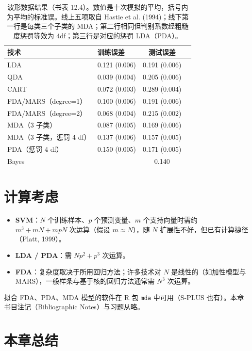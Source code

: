\begin{table}[htbp]
\centering
\caption{波形数据结果（书表 12.4）。数值是十次模拟的平均，括号内为平均的标准误。线上五项取自 Hastie et al. (1994)；线下第一行是每类三个子类的 MDA；第二行相同但判别系数经粗糙度惩罚等效为 4df；第三行是对应的惩罚 LDA（PDA）。}
\label{tab:12_4}
\begin{tabular}{llcc}
\toprule
技术 & 训练误差 & 测试误差 \\
\midrule
LDA & 0.121 (0.006) & 0.191 (0.006) \\
QDA & 0.039 (0.004) & 0.205 (0.006) \\
CART & 0.072 (0.003) & 0.289 (0.004) \\
FDA/MARS（degree=1） & 0.100 (0.006) & 0.191 (0.006) \\
FDA/MARS（degree=2） & 0.068 (0.004) & 0.215 (0.002) \\
\midrule
MDA（3 子类） & 0.087 (0.005) & 0.169 (0.006) \\
MDA（3 子类，惩罚 4 df） & 0.137 (0.006) & 0.157 (0.005) \\
PDA（惩罚 4 df） & 0.150 (0.005) & 0.171 (0.005) \\
\midrule
Bayes & & 0.140 \\
\bottomrule
\end{tabular}
\end{table}

\section{计算考虑}

\begin{itemize}
\item \textbf{SVM}：$N$ 个训练样本、$p$ 个预测变量、$m$ 个支持向量时需约 $m^3 + mN + mpN$ 次运算（假设 $m\approx N$），随 $N$ 扩展性不好，但已有计算捷径（Platt, 1999）。
\item \textbf{LDA / PDA}：需 $Np^2 + p^3$ 次运算。
\item \textbf{FDA}：复杂度取决于所用回归方法；许多技术对 $N$ 是线性的（如加性模型与 MARS），一般样条与基于核的回归方法通常需 $N^3$ 次运算。
\end{itemize}

拟合 FDA、PDA、MDA 模型的软件在 R 包 \texttt{mda} 中可用（S-PLUS 也有）。本章书目注记（Bibliographic Notes）与习题从略。

\section{本章总结}

